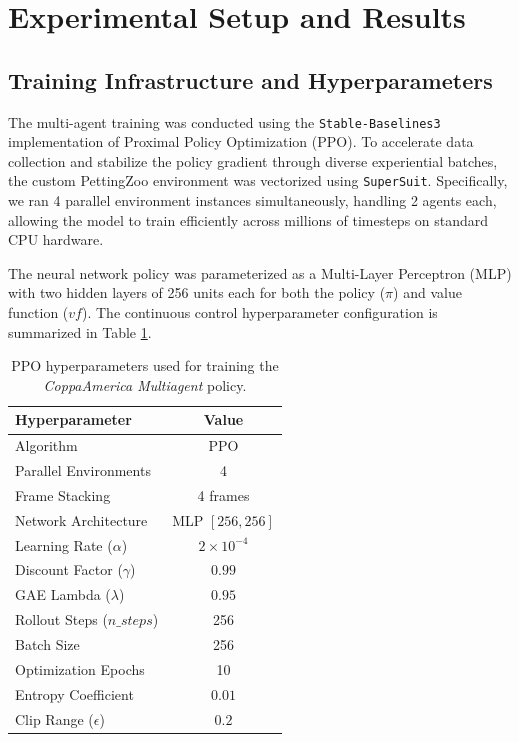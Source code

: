 \documentclass{article}
\begin{document}
\section{Experimental Setup and Results}

\subsection{Training Infrastructure and Hyperparameters}
The multi-agent training was conducted using the \texttt{Stable-Baselines3} implementation of Proximal Policy Optimization (PPO). To accelerate data collection and stabilize the policy gradient through diverse experiential batches, the custom PettingZoo environment was vectorized using \texttt{SuperSuit}. Specifically, we ran 4 parallel environment instances simultaneously, handling 2 agents each, allowing the model to train efficiently across millions of timesteps on standard CPU hardware.

The neural network policy was parameterized as a Multi-Layer Perceptron (MLP) with two hidden layers of 256 units each for both the policy ($\pi$) and value function ($vf$). The continuous control hyperparameter configuration is summarized in Table \ref{tab:hyperparameters}.

\begin{table}[htpb]
    \centering
    \renewcommand{\arraystretch}{1.2}
    \begin{tabular}{|l|c|}
        \hline
        \textbf{Hyperparameter} & \textbf{Value} \\
        \hline
        Algorithm & PPO \\
        Parallel Environments & 4 \\
        Frame Stacking & 4 frames \\
        Network Architecture & MLP $[256, 256]$ \\
        Learning Rate ($\alpha$) & $2 \times 10^{-4}$ \\
        Discount Factor ($\gamma$) & $0.99$ \\
        GAE Lambda ($\lambda$) & $0.95$ \\
        Rollout Steps ($n\_steps$) & 256 \\
        Batch Size & 256 \\
        Optimization Epochs & 10 \\
        Entropy Coefficient & $0.01$ \\
        Clip Range ($\epsilon$) & $0.2$ \\
        \hline
    \end{tabular}
    \caption{PPO hyperparameters used for training the \textit{CoppaAmerica Multiagent} policy.}
    \label{tab:hyperparameters}
\end{table}
\end{document}
